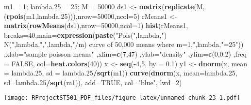 \documentclass[
]{article}
\newenvironment{Shaded}{\begin{snugshade}}{\end{snugshade}}
\newcommand{\DataTypeTok}[1]{\textcolor[rgb]{0.13,0.29,0.53}{#1}}
\newcommand{\DecValTok}[1]{\textcolor[rgb]{0.00,0.00,0.81}{#1}}
\newcommand{\FloatTok}[1]{\textcolor[rgb]{0.00,0.00,0.81}{#1}}
\newcommand{\KeywordTok}[1]{\textcolor[rgb]{0.13,0.29,0.53}{\textbf{#1}}}
\newcommand{\NormalTok}[1]{#1}
\newcommand{\OperatorTok}[1]{\textcolor[rgb]{0.81,0.36,0.00}{\textbf{#1}}}
\newcommand{\OtherTok}[1]{\textcolor[rgb]{0.56,0.35,0.01}{#1}}
\newcommand{\StringTok}[1]{\textcolor[rgb]{0.31,0.60,0.02}{#1}}
\begin{document}
\begin{Shaded}
\begin{Highlighting}[]
\NormalTok{m1 =}\StringTok{ }\DecValTok{1}\NormalTok{; lambda}\FloatTok{.25}\NormalTok{ =}\StringTok{ }\DecValTok{25}\NormalTok{; M =}\StringTok{ }\DecValTok{50000}
\NormalTok{ds1 <-}\StringTok{ }\KeywordTok{matrix}\NormalTok{(}\KeywordTok{replicate}\NormalTok{(M,(}\KeywordTok{rpois}\NormalTok{(m1,lambda}\FloatTok{.25}\NormalTok{))),}\DataTypeTok{nrow=}\DecValTok{50000}\NormalTok{,}\DataTypeTok{ncol=}\DecValTok{5}\NormalTok{)}
\NormalTok{rMeans1 <-}\StringTok{ }\KeywordTok{matrix}\NormalTok{(}\KeywordTok{rowMeans}\NormalTok{(ds1),}\DataTypeTok{nrow=}\DecValTok{50000}\NormalTok{,}\DataTypeTok{ncol=}\DecValTok{1}\NormalTok{)}
\KeywordTok{hist}\NormalTok{(rMeans1, }\DataTypeTok{breaks=}\DecValTok{40}\NormalTok{,}\DataTypeTok{main=}\KeywordTok{expression}\NormalTok{(}\KeywordTok{paste}\NormalTok{(}\StringTok{"Pois("}\NormalTok{,lambda,}\StringTok{") ~ N("}\NormalTok{,lambda,}\StringTok{","}\NormalTok{,lambda,}\StringTok{"/m) curve of 50,000 means where m=1,"}\NormalTok{,lambda,}\StringTok{"=25"}\NormalTok{))  ,}\DataTypeTok{xlab=}\StringTok{"sample poisson means"}\NormalTok{ ,}\DataTypeTok{xlim=}\KeywordTok{c}\NormalTok{(}\DecValTok{7}\NormalTok{,}\DecValTok{47}\NormalTok{) ,}\DataTypeTok{ylab=}\StringTok{"density"}\NormalTok{ ,}\DataTypeTok{ylim=}\KeywordTok{c}\NormalTok{(}\DecValTok{0}\NormalTok{,}\FloatTok{0.2}\NormalTok{) ,}\DataTypeTok{freq =} \OtherTok{FALSE}\NormalTok{, }\DataTypeTok{col=}\KeywordTok{heat.colors}\NormalTok{(}\DecValTok{40}\NormalTok{))}
\NormalTok{x <-}\StringTok{ }\KeywordTok{seq}\NormalTok{(}\OperatorTok{-}\DecValTok{4}\NormalTok{,}\DecValTok{5}\NormalTok{, }\DataTypeTok{by =} \FloatTok{0.1}\NormalTok{)}
\NormalTok{y1 <-}\StringTok{ }\KeywordTok{dnorm}\NormalTok{(x, }\DataTypeTok{mean =}\NormalTok{ lambda}\FloatTok{.25}\NormalTok{, }\DataTypeTok{sd =}\NormalTok{ lambda}\FloatTok{.25}\OperatorTok{/}\KeywordTok{sqrt}\NormalTok{(m1))}
\KeywordTok{curve}\NormalTok{(}\KeywordTok{dnorm}\NormalTok{(x, }\DataTypeTok{mean=}\NormalTok{lambda}\FloatTok{.25}\NormalTok{, }\DataTypeTok{sd=}\NormalTok{lambda}\FloatTok{.25}\OperatorTok{/}\KeywordTok{sqrt}\NormalTok{(m1)), }\DataTypeTok{add=}\OtherTok{TRUE}\NormalTok{, }\DataTypeTok{col=}\StringTok{"blue"}\NormalTok{, }\DataTypeTok{lwd=}\DecValTok{2}\NormalTok{)}
\end{Highlighting}
\end{Shaded}

\texttt{[image: RProjectST501\_PDF\_files/figure-latex/unnamed-chunk-23-1.pdf]}
\end{document}
